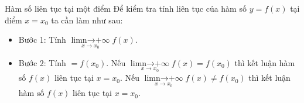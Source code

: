 \begin{dang}{Hàm số liên tục tại một điểm}
	Để kiểm tra tính liên tục của hàm số $y=f(x)$ tại điểm $x=x_0$ ta cần làm như sau:
	\begin{itemize}
		\item Bước 1: Tính $\mathop {\lim \limits{n \to +\infty}}\limits_{x \to {x_0}} f\left( x \right).$
		\item Bước 2: Tính $= f\left( {{x_0}} \right).$
		Nếu $\mathop {\lim \limits{n \to +\infty}}\limits_{x \to {x_0}} f\left( x \right) = f\left( {{x_0}} \right)$ thì kết luận hàm số $f(x)$ liên tục tại $x=x_0.$
		Nếu $\mathop {\lim \limits{n \to +\infty}}\limits_{x \to {x_0}} f\left( x \right) \ne f\left( {{x_0}} \right)$ thì kết luận hàm số $f(x)$ liên tục tại $x=x_0.$
	\end{itemize}
\end{dang}
